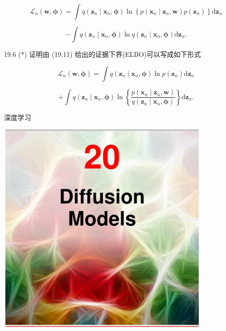 \documentclass[10pt]{article}
\begin{document}
\[
{\mathcal{L}}_{n}\left( {\mathbf{w},\mathbf{\phi }}\right)  = \int q\left( {{\mathbf{z}}_{n} \mid  {\mathbf{x}}_{n},\mathbf{\phi }}\right) \ln \left\{  {p\left( {{\mathbf{x}}_{n} \mid  {\mathbf{z}}_{n},\mathbf{w}}\right) p\left( {\mathbf{z}}_{n}\right) }\right\}  \mathrm{d}{\mathbf{z}}_{n}
\]

\[
- \int q\left( {{\mathbf{z}}_{n} \mid  {\mathbf{x}}_{n},\mathbf{\phi }}\right) \ln q\left( {{\mathbf{z}}_{n} \mid  {\mathbf{x}}_{n},\mathbf{\phi }}\right) \mathrm{d}{\mathbf{z}}_{n}. \tag{19.24}
\]

19.6 (*) 证明由 (19.11) 给出的证据下界(ELBO)可以写成如下形式

\[
{\mathcal{L}}_{n}\left( {\mathbf{w},\mathbf{\phi }}\right)  = \int q\left( {{\mathbf{z}}_{n} \mid  {\mathbf{x}}_{n},\mathbf{\phi }}\right) \ln p\left( {\mathbf{z}}_{n}\right) \mathrm{d}{\mathbf{z}}_{n}
\]

\[
+ \int q\left( {{\mathbf{z}}_{n} \mid  {\mathbf{x}}_{n},\mathbf{\phi }}\right) \ln \left\{  \frac{p\left( {{\mathbf{x}}_{n} \mid  {\mathbf{z}}_{n},\mathbf{w}}\right) }{q\left( {{\mathbf{z}}_{n} \mid  {\mathbf{x}}_{n},\mathbf{\phi }}\right) }\right\}  \mathrm{d}{\mathbf{z}}_{n}. \tag{19.25}
\]

深度学习

\begin{center}
\includegraphics[max width=0.8\textwidth]{images/0194e279-9b28-703a-88f4-c3ac21e2010d_600_474_351_1074_1086_0.jpg}
\end{center}
\hspace*{3em} 
\end{document}
